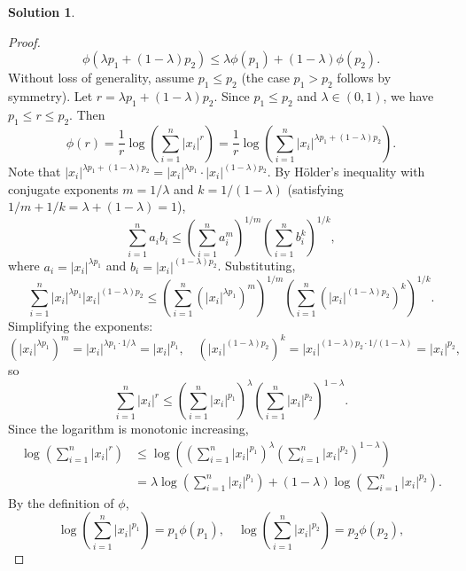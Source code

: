 \documentclass[12pt]{article}
\theoremstyle{definition}
\newtheorem*{solution}{\normalfont\textbf{Solution}}
\begin{document}
\begin{enumerate}[leftmargin=*]
\begin{solution}
\begin{proof}
                \[
                \phi(\lambda p_1 + (1-\lambda)p_2) \leq \lambda \phi(p_1) + (1-\lambda) \phi(p_2).
                \]
                Without loss of generality, assume \( p_1 \leq p_2 \) (the case \( p_1 > p_2 \) follows by symmetry). Let \( r = \lambda p_1 + (1-\lambda)p_2 \). Since \( p_1 \leq p_2 \) and \( \lambda \in (0,1) \), we have \( p_1 \leq r \leq p_2 \). Then
                \[
                \phi(r) = \frac{1}{r} \log \left( \sum_{i=1}^n |x_i|^r \right) = \frac{1}{r} \log \left( \sum_{i=1}^n |x_i|^{\lambda p_1 + (1-\lambda)p_2} \right).
                \]
                Note that \( |x_i|^{\lambda p_1 + (1-\lambda)p_2} = |x_i|^{\lambda p_1} \cdot |x_i|^{(1-\lambda)p_2} \). By Hölder's inequality with conjugate exponents \( m = 1/\lambda \) and \( k = 1/(1-\lambda) \) (satisfying \( 1/m + 1/k = \lambda + (1-\lambda) = 1 \)), 
                \[
                \sum_{i=1}^n a_i b_i \leq \left( \sum_{i=1}^n a_i^m \right)^{1/m} \left( \sum_{i=1}^n b_i^k \right)^{1/k},
                \]
                where \( a_i = |x_i|^{\lambda p_1} \) and \( b_i = |x_i|^{(1-\lambda)p_2} \). Substituting,
                \[
                \sum_{i=1}^n |x_i|^{\lambda p_1} |x_i|^{(1-\lambda)p_2} \leq \left( \sum_{i=1}^n \left( |x_i|^{\lambda p_1} \right)^m \right)^{1/m} \left( \sum_{i=1}^n \left( |x_i|^{(1-\lambda)p_2} \right)^k \right)^{1/k}.
                \]
                Simplifying the exponents:
                \[
                \left( |x_i|^{\lambda p_1} \right)^m = |x_i|^{\lambda p_1 \cdot 1/\lambda} = |x_i|^{p_1}, \quad 
                \left( |x_i|^{(1-\lambda)p_2} \right)^k = |x_i|^{(1-\lambda)p_2 \cdot 1/(1-\lambda)} = |x_i|^{p_2},
                \]
                so
                \[
                \sum_{i=1}^n |x_i|^r \leq \left( \sum_{i=1}^n |x_i|^{p_1} \right)^{\lambda} \left( \sum_{i=1}^n |x_i|^{p_2} \right)^{1-\lambda}.
                \]
                Since the logarithm is monotonic increasing,
                \begin{align*}
                \log \left( \sum_{i=1}^n |x_i|^r \right) 
                &\leq \log \left( \left( \sum_{i=1}^n |x_i|^{p_1} \right)^{\lambda} \left( \sum_{i=1}^n |x_i|^{p_2} \right)^{1-\lambda} \right)\\
                &= \lambda \log \left( \sum_{i=1}^n |x_i|^{p_1} \right) + (1-\lambda) \log \left( \sum_{i=1}^n |x_i|^{p_2} \right).
                \end{align*}
                By the definition of \( \phi \),
                \[
                \log \left( \sum_{i=1}^n |x_i|^{p_1} \right) = p_1 \phi(p_1), \quad \log \left( \sum_{i=1}^n |x_i|^{p_2} \right) = p_2 \phi(p_2),
\]
\end{proof}
\end{solution}
\end{enumerate}
\end{document}
